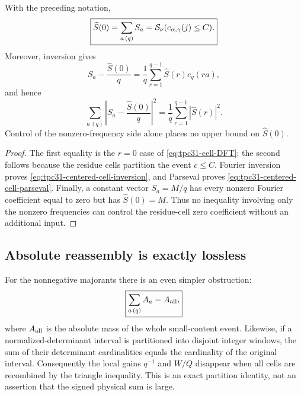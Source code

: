 \begin{proposition}
\label{prop:tpc31-zero-mode}
With the preceding notation,
\begin{equation}
 \boxed{
 \widehat S(0)=\sum_{a\, (q)}S_a
 =\mathcal S_\nu(c_{\alpha,\gamma}(j)\le C).}
 \label{eq:tpc31-zero-mode}
\end{equation}
Moreover, inversion gives
\begin{equation}
 S_a-\frac{\widehat S(0)}q
 =\frac1q\sum_{r=1}^{q-1}\widehat S(r)e_q(ra),
 \label{eq:tpc31-centered-cell-inversion}
\end{equation}
and hence
\begin{equation}
 \sum_{a\, (q)}
 \left|S_a-\frac{\widehat S(0)}q\right|^2
 =\frac1q\sum_{r=1}^{q-1}|\widehat S(r)|^2.
 \label{eq:tpc31-centered-cell-parseval}
\end{equation}
Control of the nonzero-frequency side alone places no upper bound on
$\widehat S(0)$.
\end{proposition}

\begin{proof}
The first equality is the $r=0$ case of
\eqref{eq:tpc31-cell-DFT}; the second follows because the residue cells
partition the event $c\le C$.  Fourier inversion proves
\eqref{eq:tpc31-centered-cell-inversion}, and Parseval proves
\eqref{eq:tpc31-centered-cell-parseval}.  Finally, a constant vector
$S_a=M/q$ has every nonzero Fourier coefficient equal to zero but has
$\widehat S(0)=M$.  Thus no inequality involving only the nonzero
 frequencies can control the residue-cell zero coefficient without an
 additional input.
\end{proof}

\subsection{Absolute reassembly is exactly lossless}

For the nonnegative majorants there is an even simpler obstruction:
\begin{equation}
 \boxed{
 \sum_{a\, (q)}A_a=A_{\rm all},}
 \label{eq:tpc31-absolute-residue-reassembly}
\end{equation}
where $A_{\rm all}$ is the absolute mass of the whole small-content
event.  Likewise, if a normalized-determinant interval is partitioned
into disjoint integer windows, the sum of their determinant
cardinalities equals the cardinality of the original interval.
Consequently the local gains $q^{-1}$ and $W/Q$ disappear when all
cells are recombined by the triangle inequality.  This is an exact
partition identity, not an assertion that the signed physical sum is
large.

